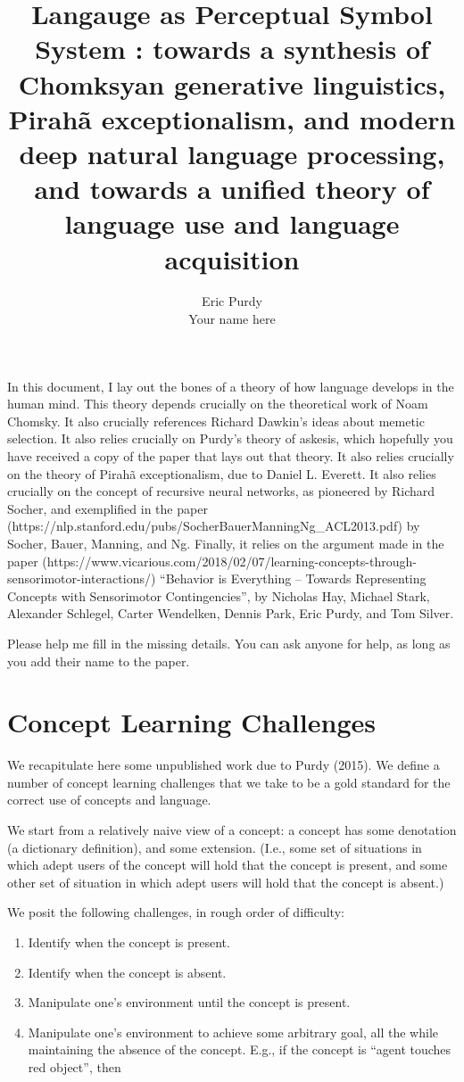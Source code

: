 \documentclass{article}
\title{Langauge as Perceptual Symbol System : towards a synthesis of
  Chomksyan generative linguistics, Pirah\~{a} exceptionalism, and
  modern deep natural language processing, and towards a unified
  theory of language use and language acquisition}
\author{Eric Purdy \\ Your name here}
\begin{document}
In this document, I lay out the bones of a theory of how language
develops in the human mind. This theory depends crucially on the
theoretical work of Noam Chomsky. It also crucially references Richard
Dawkin's ideas about memetic selection. It also relies crucially on
Purdy's theory of askesis, which hopefully you have received a copy of
the paper that lays out that theory. It also relies crucially on the
theory of Pirah\~{a} exceptionalism, due to Daniel L. Everett. It also
relies crucially on the concept of recursive neural networks, as
pioneered by Richard Socher, and exemplified in the paper
(https://nlp.stanford.edu/pubs/SocherBauerManningNg\_ACL2013.pdf) by
Socher, Bauer, Manning, and Ng. Finally, it relies on the argument
made in the paper
(https://www.vicarious.com/2018/02/07/learning-concepts-through-sensorimotor-interactions/)
``Behavior is Everything – Towards Representing Concepts with
Sensorimotor Contingencies'', by Nicholas Hay, Michael Stark, Alexander
Schlegel, Carter Wendelken, Dennis Park, Eric Purdy, and Tom Silver.

Please help me fill in the missing details. You can ask anyone for
help, as long as you add their name to the paper.

\section{Concept Learning Challenges}

We recapitulate here some unpublished work due to Purdy (2015). We
define a number of concept learning challenges that we take to be a
gold standard for the correct use of concepts and language.

We start from a relatively naive view of a concept: a concept has some
denotation (a dictionary definition), and some extension. (I.e., some
set of situations in which adept users of the concept will hold that
the concept is present, and some other set of situation in which adept
users will hold that the concept is absent.)

We posit the following challenges, in rough order of difficulty:

\begin{enumerate}
\item Identify when the concept is present.
\item Identify when the concept is absent.
\item Manipulate one's environment until the concept is present.
  \item Manipulate one's environment to achieve some arbitrary goal,
    all the while maintaining the absence of the concept. E.g., if the concept is ``agent touches red object'', then 
\end{enumerate}
\end{document}
